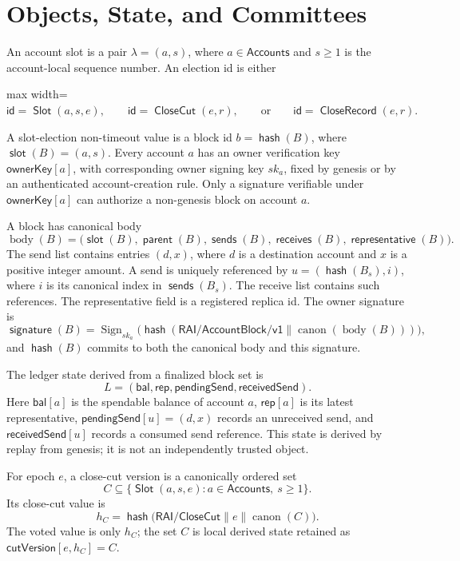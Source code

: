 \documentclass[sigplan,twocolumn,review,anonymous]{acmart}
\newcommand{\func}[1]{\operatorname{\mathsf{#1}}}
\newcommand{\hash}{\func{hash}}
\newcommand{\id}{\mathsf{id}}
\newcommand{\Slot}{\func{Slot}}
\newcommand{\CloseCut}{\func{CloseCut}}
\newcommand{\CloseRecord}{\func{CloseRecord}}
\newcommand{\parent}{\func{parent}}
\newcommand{\slotOf}{\func{slot}}
\newcommand{\cutVersion}{\mathsf{cutVersion}}
\newcommand{\ownerKey}{\mathsf{ownerKey}}
\newcommand{\signatureOf}{\func{signature}}
\newcommand{\sendsOf}{\func{sends}}
\newcommand{\receivesOf}{\func{receives}}
\newcommand{\representativeOf}{\func{representative}}
\newcommand{\bal}{\mathsf{bal}}
\newcommand{\repOf}{\mathsf{rep}}
\newcommand{\pendingSend}{\mathsf{pendingSend}}
\newcommand{\receivedSend}{\mathsf{receivedSend}}
\begin{document}
\section{Objects, State, and Committees}

An account slot is a pair \(\lambda=(a,s)\), where \(a\in\mathsf{Accounts}\) and
\(s\ge1\) is the account-local sequence number.  An election id is either
\begin{center}
\begin{adjustbox}{max width=\columnwidth}
\(\displaystyle
    \id=\Slot(a,s,e),\qquad \id=\CloseCut(e,r),\qquad\text{or}\qquad
    \id=\CloseRecord(e,r).
\)
\end{adjustbox}
\end{center}
A slot-election non-timeout value is a block id \(b=\hash(B)\), where
\(\slotOf(B)=(a,s)\).  Every account \(a\) has an owner verification key
\(\ownerKey[a]\), with corresponding owner signing key \(sk_a\), fixed by genesis or by an
authenticated account-creation rule.  Only a signature verifiable under \(\ownerKey[a]\) can
authorize a non-genesis block on account \(a\).

A block has canonical body
\[
\operatorname{body}(B)=
\bigl(\slotOf(B),\parent(B),\sendsOf(B),\receivesOf(B),\representativeOf(B)\bigr).
\]
The send list contains entries \((d,x)\), where \(d\) is a destination account and \(x\) is a positive
integer amount.  A send is uniquely referenced by \(u=(\hash(B_s),i)\), where \(i\) is its canonical
index in \(\sendsOf(B_s)\).  The receive list contains such references.  The representative field is a
registered replica id.  The owner signature is
\[
\signatureOf(B)=\operatorname{Sign}_{sk_a}
\bigl(\hash(\mathsf{RAI/AccountBlock/v1}\parallel\operatorname{canon}(\operatorname{body}(B)))\bigr),
\]
and \(\hash(B)\) commits to both the canonical body and this signature.

The ledger state derived from a finalized block set is
\[
L=(\bal,\repOf,\pendingSend,\receivedSend).
\]
Here \(\bal[a]\) is the spendable balance of account \(a\), \(\repOf[a]\) is its latest
representative, \(\pendingSend[u]=(d,x)\) records an unreceived send, and
\(\receivedSend[u]\) records a consumed send reference.  This state is derived by replay from genesis;
it is not an independently trusted object.

For epoch \(e\), a close-cut version is a canonically ordered set
\[
C\subseteq\{\Slot(a,s,e):a\in\mathsf{Accounts},\ s\ge1\}.
\]
Its close-cut value is
\[
h_C=\hash\bigl(\mathsf{RAI/CloseCut}\parallel e\parallel\operatorname{canon}(C)\bigr).
\]
The voted value is only \(h_C\); the set \(C\) is local derived state retained as
\(\cutVersion[e,h_C]=C\).
\end{document}
